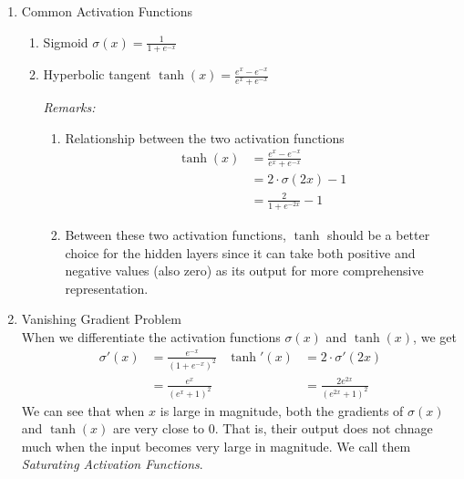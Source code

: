 \documentclass[11pt]{article}
\begin{document}
\begin{enumerate}
\item Common Activation Functions
\begin{enumerate}
    \item Sigmoid $\sigma (x) = \frac{1}{1 + e^{-x}}$
    \item Hyperbolic tangent $\tanh(x) = \frac{e^x - e^{-x}}{e^x + e^{-x}}$
    \begin{center}
    \end{center}
    \textit{Remarks:} 
    \begin{enumerate}
        \item Relationship between the two activation functions
        \begin{align*}
            \tanh (x) &= \frac{e^x - e^{-x}}{e^x + e^{-x}} \\
            &= 2 \cdot \sigma(2x) -1\\
            &= \frac{2}{1+e^{-2x}} -1
        \end{align*}
        \item Between these two activation functions, $\tanh$ should be a better choice for the hidden layers since it can take both positive and negative values (also zero) as its output for more comprehensive representation.
    \end{enumerate}
\end{enumerate}
\item Vanishing Gradient Problem\\
When we differentiate the activation functions $\sigma (x)$ and $\tanh (x)$, we get
\begin{align*}
    \sigma'(x) &= \frac{e^{-x}}{(1+e^{-x})^2}& \tanh'(x)&=2 \cdot \sigma'(2x)\\
    &= \frac{e^x}{(e^x +1)^2} &&= \frac{2e^{2x}}{(e^{2x}+1)^2}
\end{align*}
We can see that when $x$ is large in magnitude, both the gradients of $\sigma (x)$ and $\tanh (x)$ are very close to $0$. That is, their output does not chnage much when the input becomes very large in magnitude. We call them \emph{Saturating Activation Functions}.


\end{enumerate}
\end{document}
